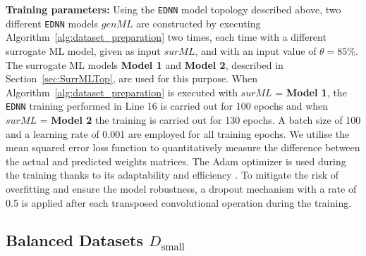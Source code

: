 \documentclass[letterpaper]{article}
\begin{document}
\textbf{Training parameters:}
Using the \texttt{EDNN} model topology described above, two different \texttt{EDNN} models $genML$ are constructed by executing Algorithm~\ref{alg:dataset_preparation} two times, each time with a different surrogate ML model, given as input $surML$, and with an input value of $\theta = 85\%$. The surrogate ML models \textbf{Model 1} and \textbf{Model 2}, described in Section~\ref{sec:SurrMLTop}, are used for this purpose. When Algorithm~\ref{alg:dataset_preparation} is executed with $surML$ = \textbf{Model 1}, the \texttt{EDNN} training performed in Line 16 is carried out for 100 epochs and when $surML$ = \textbf{Model 2} the training is carried out for 130 epochs. A batch size of 100 and a learning rate of 0.001 are employed for all training epochs. We utilise the mean squared error loss function to quantitatively measure the difference between the actual and predicted weights matrices. The Adam optimizer is used during the training thanks to its adaptability and efficiency \cite{Hassan2023}.
To mitigate the risk of overfitting and ensure the model robustness, a dropout mechanism with a rate of 0.5 is applied after each transposed convolutional operation during the training.


\subsection{Balanced Datasets $D_{\text{small}}$}
\label{sec:D_small}
\end{document}
